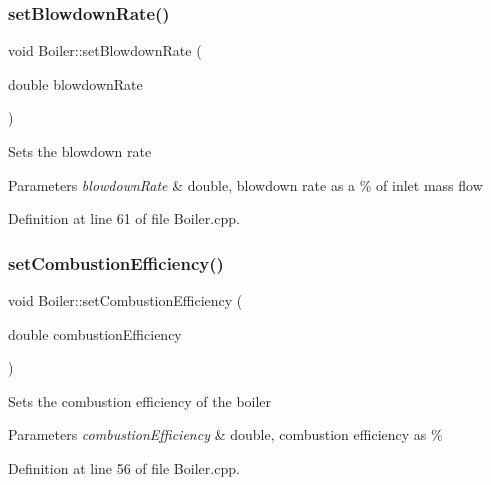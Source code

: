 \subsubsection{\texorpdfstring{set\+Blowdown\+Rate()}{setBlowdownRate()}\hspace{0.1cm}{\footnotesize\ttfamily [3/3]}}
{\footnotesize\ttfamily void Boiler\+::set\+Blowdown\+Rate (\begin{DoxyParamCaption}\item[{double}]{blowdown\+Rate }\end{DoxyParamCaption})}

Sets the blowdown rate 
\begin{DoxyParams}{Parameters}
{\em blowdown\+Rate} & double, blowdown rate as a \% of inlet mass flow \\
\hline
\end{DoxyParams}


Definition at line 61 of file Boiler.\+cpp.

\mbox{\label{class_boiler_abef6bc48101f98f0650cb07fb1d51f74}} 
\subsubsection{\texorpdfstring{set\+Combustion\+Efficiency()}{setCombustionEfficiency()}\hspace{0.1cm}{\footnotesize\ttfamily [1/3]}}
{\footnotesize\ttfamily void Boiler\+::set\+Combustion\+Efficiency (\begin{DoxyParamCaption}\item[{double}]{combustion\+Efficiency }\end{DoxyParamCaption})}

Sets the combustion efficiency of the boiler 
\begin{DoxyParams}{Parameters}
{\em combustion\+Efficiency} & double, combustion efficiency as \% \\
\hline
\end{DoxyParams}


Definition at line 56 of file Boiler.\+cpp.

\mbox{\label{class_boiler_abef6bc48101f98f0650cb07fb1d51f74}} 
